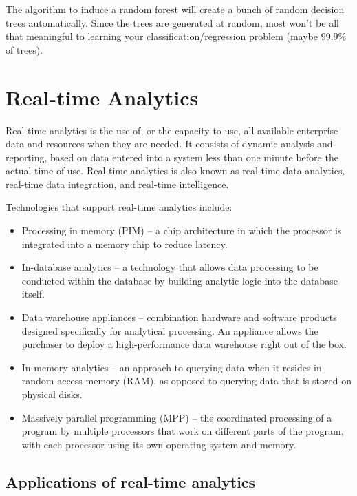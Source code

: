 \documentclass[11pt]{article} %
\begin{document}
The algorithm to induce a random forest will create a bunch of random decision trees automatically. Since the trees are generated at random, most won't be all that meaningful to learning your classification/regression problem (maybe 99.9\% of trees).


\newpage
\section{Real-time Analytics}


Real-time analytics is the use of, or the capacity to use, all available enterprise data and resources when they are needed. It consists of dynamic analysis and reporting, based on data entered into a system less than one minute before the actual time of use. Real-time analytics is also known as real-time data analytics, real-time data integration, and real-time intelligence.


Technologies that support real-time analytics include:
\begin{itemize}
\item
Processing in memory (PIM) --  a chip architecture in which the processor is integrated into a memory chip to reduce latency.

\item
In-database analytics -- a technology that allows data processing to be conducted within the database by building analytic logic into the database itself.

\item
Data warehouse appliances -- combination hardware and software products designed specifically for analytical processing. An appliance allows the purchaser to deploy a high-performance data warehouse right out of the box.

\item
In-memory analytics -- an approach to querying data when it resides in random access memory (RAM), as opposed to querying data that is stored on physical disks.

\item
Massively parallel programming (MPP) -- the coordinated processing of a program by multiple processors that work on different parts of the program, with each processor using its own operating system and memory.
\end{itemize}

\subsection{Applications of real-time analytics}
\end{document}
